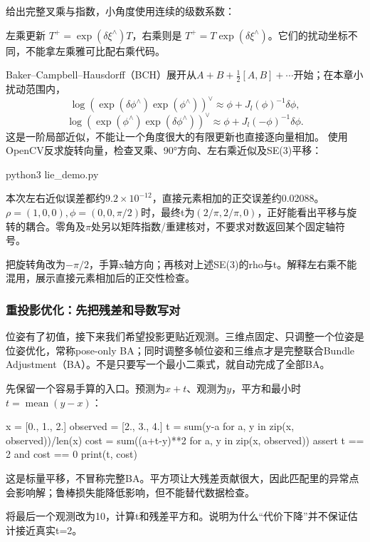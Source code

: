\begin{example}
给出完整叉乘与指数，小角度使用连续的级数系数：

左乘更新 $T^+=\exp(\delta\xi^\wedge)T$，右乘则是 $T^+=T\exp(\delta\xi^\wedge)$。它们的扰动坐标不同，不能拿左乘雅可比配右乘代码。

Baker--Campbell--Hausdorff（BCH）展开从$A+B+\frac12[A,B]+\cdots$开始；在本章小扰动范围内，
\[
\log(\exp(\delta\phi^\wedge)\exp(\phi^\wedge))^\vee
\approx\phi+J_l(\phi)^{-1}\delta\phi,
\]
\[
\log(\exp(\phi^\wedge)\exp(\delta\phi^\wedge))^\vee
\approx\phi+J_l(-\phi)^{-1}\delta\phi.
\]
这是一阶局部近似，不能让一个角度很大的有限更新也直接逐向量相加。
使用OpenCV反求旋转向量，检查叉乘、90°方向、左右乘近似及SE(3)平移：

\begin{tbash}
python3 lie_demo.py
\end{tbash}
本次左右近似误差都约$9.2\times10^{-12}$，直接元素相加的正交误差约0.02088。$\rho=(1,0,0),\phi=(0,0,\pi/2)$时，最终t为$(2/\pi,2/\pi,0)$，正好能看出平移与旋转的耦合。零角及$\pi$处另以矩阵指数/重建核对，不要求对数返回某个固定轴符号。
\end{example}
\begin{exercise}\label{ex:v2-ba-lie}
把旋转角改为$-\pi/2$，手算x轴方向；再核对上述SE(3)的rho与t。解释左右乘不能混用，展示直接元素相加后的正交性检查。
\end{exercise}

\subsubsection{重投影优化：先把残差和导数写对}
位姿有了初值，接下来我们希望投影更贴近观测。三维点固定、只调整一个位姿是位姿优化，常称pose-only BA；同时调整多帧位姿和三维点才是完整联合Bundle Adjustment（BA）。不是只要写一个最小二乘式，就自动完成了全部BA。

先保留一个容易手算的入口。预测为$x+t$、观测为$y$，平方和最小时 $t=\operatorname{mean}(y-x)$：
\begin{example}[异常点会把最小二乘拉向哪里]
\begin{tpython}
x = [0., 1., 2.]
observed = [2., 3., 4.]
t = sum(y-a for a, y in zip(x, observed))/len(x)
cost = sum((a+t-y)**2 for a, y in zip(x, observed))
assert t == 2 and cost == 0
print(t, cost)
\end{tpython}
这是标量平移，不冒称完整BA。平方项让大残差贡献很大，因此匹配里的异常点会影响解；鲁棒损失能降低影响，但不能替代数据检查。
\end{example}
\begin{exercise}\label{ex:v2-ba-least}
将最后一个观测改为10，计算t和残差平方和。说明为什么“代价下降”并不保证估计接近真实t=2。
\end{exercise}

